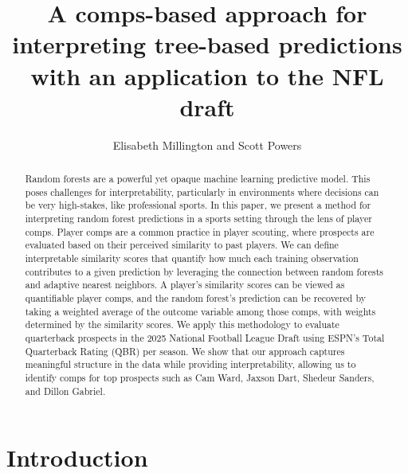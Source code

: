 \documentclass[Review, sageh, times]{sagej}
\begin{document}

\title{A comps-based approach for interpreting tree-based predictions with an application to the NFL draft}

\author{Elisabeth Millington and Scott Powers}




\begin{abstract}
  Random forests are a powerful yet opaque machine learning predictive model. This poses challenges for interpretability, particularly in environments where decisions can be very high-stakes, like professional sports. In this paper, we present a method for interpreting random forest predictions in a sports setting through the lens of player comps. Player comps are a common practice in player scouting, where prospects are evaluated based on their perceived similarity to past players. We can define interpretable similarity scores that quantify how much each training observation contributes to a given prediction by leveraging the connection between random forests and adaptive nearest neighbors. A player's similarity scores can be viewed as quantifiable player comps, and the random forest's prediction can be recovered by taking a weighted average of the outcome variable among those comps, with weights determined by the similarity scores. We apply this methodology to evaluate quarterback prospects in the 2025 National Football League Draft using ESPN's Total Quarterback Rating (QBR) per season. We show that our approach captures meaningful structure in the data while providing interpretability, allowing us to identify comps for top prospects such as Cam Ward, Jaxson Dart, Shedeur Sanders, and Dillon Gabriel.
\end{abstract}


\maketitle

\section{Introduction}
\end{document}
